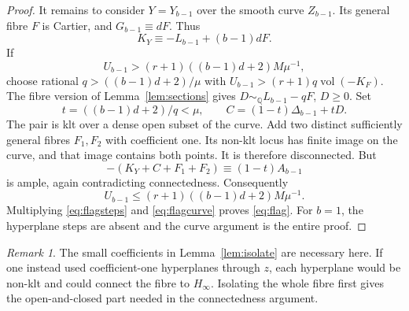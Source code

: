 \documentclass[11pt,reqno]{amsart}
\numberwithin{equation}{section}
\theoremstyle{definition}
\theoremstyle{remark}
\newtheorem{remark}[theorem]{Remark}
\newcommand{\Q}{\mathbb Q}
\newcommand{\simq}{\sim_{\Q}}
\newcommand{\vol}{\operatorname{vol}}
\begin{document}
\begin{proof}
It remains to consider $Y=Y_{b-1}$ over the smooth curve $Z_{b-1}$. Its general fibre $F$ is Cartier, and $G_{b-1}\equiv dF$. Thus
\[
 K_Y\equiv-L_{b-1}+(b-1)dF.
\]
If
\[
 U_{b-1}>(r+1)((b-1)d+2)M\mu^{-1},
\]
choose rational $q>((b-1)d+2)/\mu$ with
$U_{b-1}>(r+1)q\vol(-K_F)$. The fibre version of Lemma~\ref{lem:sections} gives $D\simq L_{b-1}-qF$, $D\ge0$. Set
\[
 t=((b-1)d+2)/q<\mu,\qquad C=(1-t)\Delta_{b-1}+tD.
\]
The pair is klt over a dense open subset of the curve. Add two distinct sufficiently general fibres $F_1,F_2$ with coefficient one. Its non-klt locus has finite image on the curve, and that image contains both points. It is therefore disconnected. But
\[
 -(K_Y+C+F_1+F_2)\equiv(1-t)A_{b-1}
\]
is ample, again contradicting connectedness. Consequently
\begin{equation}\label{eq:flagcurve}
 U_{b-1}\le(r+1)((b-1)d+2)M\mu^{-1}.
\end{equation}
Multiplying \eqref{eq:flagsteps} and \eqref{eq:flagcurve} proves \eqref{eq:flag}. For $b=1$, the hyperplane steps are absent and the curve argument is the entire proof.
\end{proof}

\begin{remark}
The small coefficients in Lemma~\ref{lem:isolate} are necessary here. If one instead used coefficient-one hyperplanes through $z$, each hyperplane would be non-klt and could connect the fibre to $H_\infty$. Isolating the whole fibre first gives the open-and-closed part needed in the connectedness argument.
\end{remark}
\end{document}
